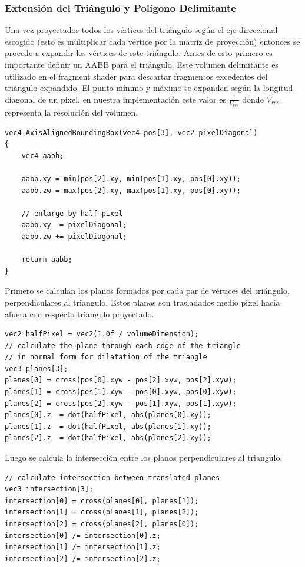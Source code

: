 \subsubsection{Extensión del Triángulo y Polígono Delimitante}
Una vez proyectados todos los vértices del triángulo según el eje direccional escogido (esto es multiplicar cada vértice por la matriz de proyección) entonces se procede a expandir los vértices de este triángulo. Antes de esto primero es importante definir un \ac{AABB} para el triángulo. Este volumen delimitante es utilizado en el fragment shader para descartar fragmentos excedentes del triángulo expandido. El punto mínimo y máximo se expanden según la longitud diagonal de un pixel, en nuestra implementación este valor es $\frac{1}{V_{res}}$ donde $V_{res}$ representa la resolución del volumen.
\\
\begin{lstlisting}[caption={Creacion de un \ac{AABB} para el triángulo proyectado.}, label=AxisAlignedBoundingBox]
vec4 AxisAlignedBoundingBox(vec4 pos[3], vec2 pixelDiagonal)
{
	vec4 aabb;

	aabb.xy = min(pos[2].xy, min(pos[1].xy, pos[0].xy));
	aabb.zw = max(pos[2].xy, max(pos[1].xy, pos[0].xy));

	// enlarge by half-pixel
	aabb.xy -= pixelDiagonal;
	aabb.zw += pixelDiagonal;

	return aabb;
}
\end{lstlisting}

Primero se calculan los planos formados por cada par de vértices del triángulo, perpendiculares al triangulo. Estos planos son trasladados medio pixel hacia afuera con respecto triangulo proyectado.
\\
\begin{lstlisting}[caption={Planos por cada par de vértices del triángulo proyectado.}, label=TPlanes]
vec2 halfPixel = vec2(1.0f / volumeDimension);
// calculate the plane through each edge of the triangle
// in normal form for dilatation of the triangle
vec3 planes[3];
planes[0] = cross(pos[0].xyw - pos[2].xyw, pos[2].xyw);
planes[1] = cross(pos[1].xyw - pos[0].xyw, pos[0].xyw);
planes[2] = cross(pos[2].xyw - pos[1].xyw, pos[1].xyw);
planes[0].z -= dot(halfPixel, abs(planes[0].xy));
planes[1].z -= dot(halfPixel, abs(planes[1].xy));
planes[2].z -= dot(halfPixel, abs(planes[2].xy));
\end{lstlisting}

Luego se calcula la intersección entre los planos perpendiculares al triangulo.
\\
\begin{lstlisting}[caption={Intersección entre planos perpendiculares al triangulo proyectado.}, label=TPlanes2]
// calculate intersection between translated planes
vec3 intersection[3];
intersection[0] = cross(planes[0], planes[1]);
intersection[1] = cross(planes[1], planes[2]);
intersection[2] = cross(planes[2], planes[0]);
intersection[0] /= intersection[0].z;
intersection[1] /= intersection[1].z;
intersection[2] /= intersection[2].z;
\end{lstlisting}

